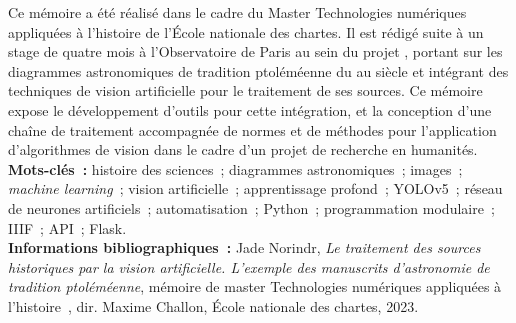\medskip	

Ce mémoire a été réalisé dans le cadre du Master Technologies numériques appliquées à l'histoire de l'École nationale des chartes. Il est rédigé suite à un stage de quatre mois à  l'Observatoire de Paris au sein du projet \eida, portant sur les diagrammes astronomiques de tradition ptoléméenne du \viii au \xviii siècle et intégrant des techniques de vision artificielle pour le traitement de ses sources. Ce mémoire expose le développement d'outils pour cette intégration, et la conception d'une chaîne de traitement accompagnée de normes et de méthodes pour l'application d'algorithmes de vision dans le cadre d'un projet de recherche en humanités.\\

\textbf{Mots-clés~:} histoire des sciences~; diagrammes astronomiques~; images~; \textit{machine learning}~; vision artificielle~; apprentissage profond~; YOLOv5~; réseau de neurones artificiels~; automatisation~; Python~; programmation modulaire~; IIIF~; API~; Flask.\\

\textbf{Informations bibliographiques~:} Jade Norindr, \textit{Le traitement des sources historiques par la vision artificielle. L'exemple des manuscrits d'astronomie de tradition ptoléméenne}, mémoire de master \og Technologies numériques appliquées à l'histoire~\fg, dir. Maxime Challon, École nationale des chartes, 2023.	
\clearemptydoublepage